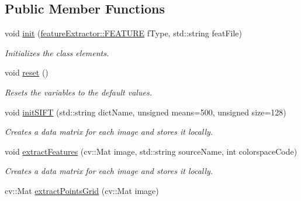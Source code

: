 \subsection*{Public Member Functions}
\begin{DoxyCompactItemize}
\item 
\hypertarget{classfeatureExtractor_aebb97884208813fa41ef1fe7bbe49a73}{
void \hyperlink{classfeatureExtractor_aebb97884208813fa41ef1fe7bbe49a73}{init} (\hyperlink{classfeatureExtractor_a84a8847c4124b284d1d5ae20bc9be583}{featureExtractor::FEATURE} fType, std::string featFile)}
\label{classfeatureExtractor_aebb97884208813fa41ef1fe7bbe49a73}

\begin{DoxyCompactList}\small\item\em Initializes the class elements. \item\end{DoxyCompactList}\item 
\hypertarget{classfeatureExtractor_ad20897c5c8bd47f5d4005989bead0e55}{
void \hyperlink{classfeatureExtractor_ad20897c5c8bd47f5d4005989bead0e55}{reset} ()}
\label{classfeatureExtractor_ad20897c5c8bd47f5d4005989bead0e55}

\begin{DoxyCompactList}\small\item\em Resets the variables to the default values. \item\end{DoxyCompactList}\item 
void \hyperlink{classfeatureExtractor_a41425a8e80bd7881f4d0e15da8f17a77}{initSIFT} (std::string dictName, unsigned means=500, unsigned size=128)
\begin{DoxyCompactList}\small\item\em Creates a data matrix for each image and stores it locally. \item\end{DoxyCompactList}\item 
\hypertarget{classfeatureExtractor_af5656e0ce12663e0896ffcf941cd7ad5}{
void \hyperlink{classfeatureExtractor_af5656e0ce12663e0896ffcf941cd7ad5}{extractFeatures} (cv::Mat image, std::string sourceName, int colorspaceCode)}
\label{classfeatureExtractor_af5656e0ce12663e0896ffcf941cd7ad5}

\begin{DoxyCompactList}\small\item\em Creates a data matrix for each image and stores it locally. \item\end{DoxyCompactList}\item 
\hypertarget{classfeatureExtractor_ae7007dbbde153212c36762e0a2f9368c}{
cv::Mat \hyperlink{classfeatureExtractor_ae7007dbbde153212c36762e0a2f9368c}{extractPointsGrid} (cv::Mat image)}
\label{classfeatureExtractor_ae7007dbbde153212c36762e0a2f9368c}


\end{DoxyCompactItemize}
